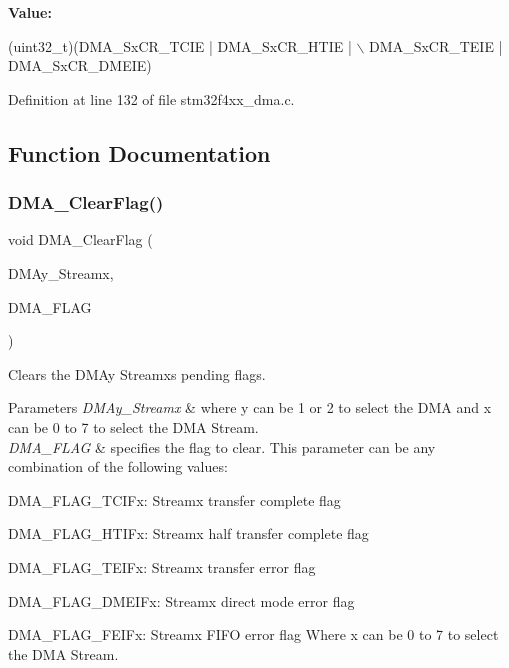 {\bfseries Value\+:}
\begin{DoxyCode}
(uint32\_t)(DMA\_SxCR\_TCIE | DMA\_SxCR\_HTIE | \(\backslash\)
                                           DMA\_SxCR\_TEIE | DMA\_SxCR\_DMEIE)
\end{DoxyCode}


Definition at line 132 of file stm32f4xx\+\_\+dma.\+c.



\subsection{Function Documentation}
\mbox{\label{group___d_m_a_ga510d62b4051f5a5de164e84b266b851d}} 
\subsubsection{\texorpdfstring{D\+M\+A\+\_\+\+Clear\+Flag()}{DMA\_ClearFlag()}}
{\footnotesize\ttfamily void D\+M\+A\+\_\+\+Clear\+Flag (\begin{DoxyParamCaption}\item[{\hyperlink{struct_d_m_a___stream___type_def}{D\+M\+A\+\_\+\+Stream\+\_\+\+Type\+Def} $\ast$}]{D\+M\+Ay\+\_\+\+Streamx,  }\item[{uint32\+\_\+t}]{D\+M\+A\+\_\+\+F\+L\+AG }\end{DoxyParamCaption})}



Clears the D\+M\+Ay Streamx\textquotesingle{}s pending flags. 


\begin{DoxyParams}{Parameters}
{\em D\+M\+Ay\+\_\+\+Streamx} & where y can be 1 or 2 to select the D\+MA and x can be 0 to 7 to select the D\+MA Stream. \\
\hline
{\em D\+M\+A\+\_\+\+F\+L\+AG} & specifies the flag to clear. This parameter can be any combination of the following values\+: \begin{DoxyItemize}
\item D\+M\+A\+\_\+\+F\+L\+A\+G\+\_\+\+T\+C\+I\+Fx\+: Streamx transfer complete flag \item D\+M\+A\+\_\+\+F\+L\+A\+G\+\_\+\+H\+T\+I\+Fx\+: Streamx half transfer complete flag \item D\+M\+A\+\_\+\+F\+L\+A\+G\+\_\+\+T\+E\+I\+Fx\+: Streamx transfer error flag \item D\+M\+A\+\_\+\+F\+L\+A\+G\+\_\+\+D\+M\+E\+I\+Fx\+: Streamx direct mode error flag \item D\+M\+A\+\_\+\+F\+L\+A\+G\+\_\+\+F\+E\+I\+Fx\+: Streamx F\+I\+FO error flag Where x can be 0 to 7 to select the D\+MA Stream. \end{DoxyItemize}
\\
\hline
\end{DoxyParams}

